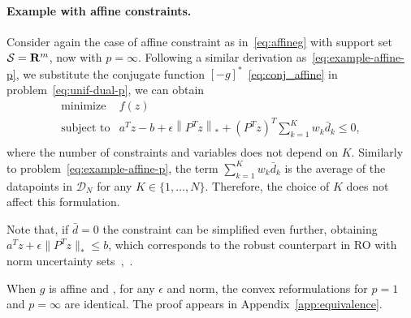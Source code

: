 \paragraph{Example with affine constraints.}%
\label{par:example}
Consider again the case of affine constraint as in~\eqref{eq:affineg} with support set $\mathcal{S} = {\mathbf R}^m$, now with $p=\infty$.
Following a similar derivation as~\eqref{eq:example-affine-p}, we substitute the conjugate function $[-g]^*$~\eqref{eq:conj_affine} in problem~\eqref{eq:unif-dual-p}, we can obtain
\begin{equation}
	\label{eq:example-affine-inf}
	\begin{array}{ll}
		\mbox{minimize} & f(z)\\
		\mbox{subject to} & a^Tz - b + \epsilon\left\|P^Tz \right\|_* + (P^Tz)^T\sum_{k=1}^{K} w_k \bar{d}_k \le 0,\\
	\end{array}
\end{equation}
where the number of constraints and variables does not depend on $K$.
Similarly to problem~\eqref{eq:example-affine-p}, the term $\sum_{k=1}^{K} w_k \bar{d}_k$ is the average of the datapoints in $\mathcal{D}_N$ for any $K \in \{1,\dots,N\}$. Therefore, the choice of $K$ does not affect this formulation.

Note that, if $\bar{d} = 0$ the constraint can be simplified even further, obtaining ${a^Tz + \epsilon\|P^Tz\|_* \le b}$, which corresponds to the robust counterpart in \gls{RO} with norm uncertainty sets~\citep[Section 2.3]{robustadaptopt},~\citep[Chapter 2]{ben-tal_robust_2009}.

\begin{remark}
	When $g$ is affine and , for any $\epsilon$ and norm, the convex reformulations for $p = 1$ and $p = \infty$ are identical. The proof appears in Appendix~\ref{app:equivalence}.
\end{remark}


